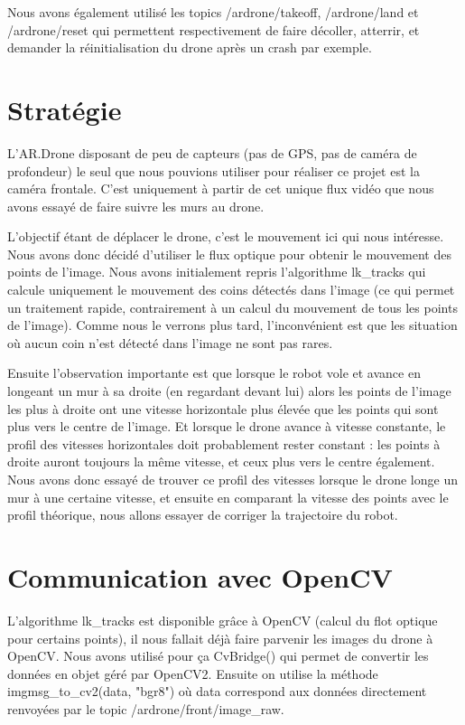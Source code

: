 \documentclass[titlepage,11pt,a4paper]{article}
\begin{document}
Nous avons également utilisé les topics /ardrone/takeoff, /ardrone/land et /ardrone/reset qui permettent respectivement de faire décoller, atterrir, et demander la réinitialisation du drone après un crash par exemple.

\section{Stratégie}
L'AR.Drone disposant de peu de capteurs (pas de GPS, pas de caméra de profondeur) le seul que nous pouvions utiliser pour réaliser ce projet est la caméra frontale. C'est uniquement à partir de cet unique flux vidéo que nous avons essayé de faire suivre les murs au drone.

L'objectif étant de déplacer le drone, c'est le mouvement ici qui nous intéresse. Nous avons donc décidé d'utiliser le flux optique pour obtenir le mouvement des points de l'image. Nous avons initialement repris l'algorithme lk\_tracks qui calcule uniquement le mouvement des coins détectés dans l'image (ce qui permet un traitement rapide, contrairement à un calcul du mouvement de tous les points de l'image). Comme nous le verrons plus tard, l'inconvénient est que les situation où aucun coin n'est détecté dans l'image ne sont pas rares.

Ensuite l'observation importante est que lorsque le robot vole et avance en longeant un mur à sa droite (en regardant devant lui) alors les points de l'image les plus à droite ont une vitesse horizontale plus élevée que les points qui sont plus vers le centre de l'image. Et lorsque le drone avance à vitesse constante, le profil des vitesses horizontales doit probablement rester constant : les points à droite auront toujours la même vitesse, et ceux plus vers le centre également. Nous avons donc essayé de trouver ce profil des vitesses lorsque le drone longe un mur à une certaine vitesse, et ensuite en comparant la vitesse des points avec le profil théorique, nous allons essayer de corriger la trajectoire du robot.

\section{Communication avec OpenCV}
L'algorithme lk\_tracks est disponible grâce à OpenCV (calcul du flot optique pour certains points), il nous fallait déjà faire parvenir les images du drone à OpenCV. Nous avons utilisé pour ça CvBridge() qui permet de convertir les données en objet géré par OpenCV2. Ensuite on utilise la méthode imgmsg\_to\_cv2(data, "bgr8") où data correspond aux données directement renvoyées par le topic /ardrone/front/image\_raw.
\end{document}
